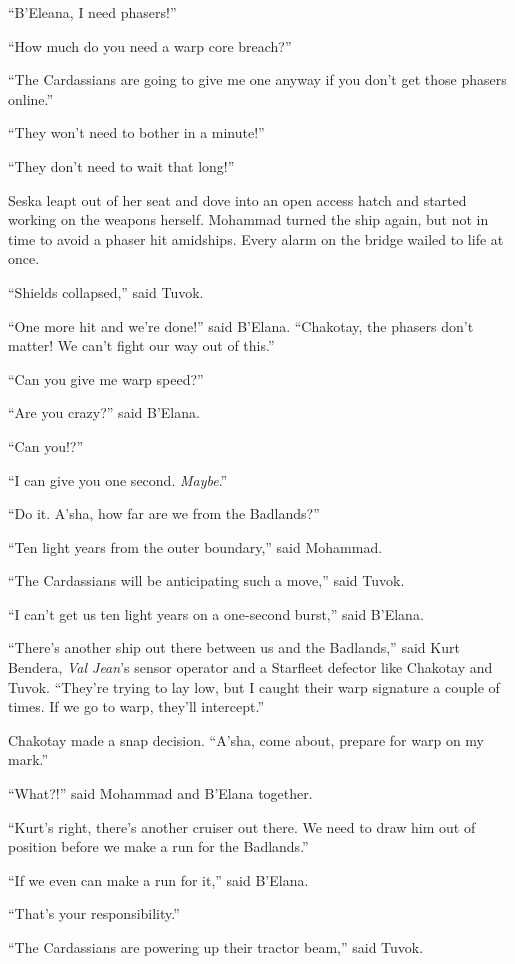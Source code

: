 \documentclass[twoside,letterpaper,12pt]{memoir}
\begin{document}
``B'Eleana, I need phasers!''

``How much do you need a warp core breach?''

``The Cardassians are going to give me one anyway if you don't get those phasers online.''

``They won't need to bother in a minute!''

``They don't need to wait that long!''

Seska leapt out of her seat and dove into an open access hatch and started working on the weapons herself. Mohammad turned the ship again, but not in time to avoid a phaser hit amidships. Every alarm on the bridge wailed to life at once.

``Shields collapsed,'' said Tuvok.

``One more hit and we're done!'' said B'Elana. ``Chakotay, the phasers don't matter! We can't fight our way out of this.''

``Can you give me warp speed?''

``Are you crazy?'' said B'Elana.

``Can you!?''

``I can give you one second. \textit{Maybe}.''

``Do it. A'sha, how far are we from the Badlands?''

``Ten light years from the outer boundary,'' said Mohammad.

``The Cardassians will be anticipating such a move,'' said Tuvok.

``I can't get us ten light years on a one-second burst,'' said B'Elana.

``There's another ship out there between us and the Badlands,'' said Kurt Bendera, \textit{Val Jean}'s sensor operator and a Starfleet defector like Chakotay and Tuvok. ``They're trying to lay low, but I caught their warp signature a couple of times. If we go to warp, they'll intercept.''

Chakotay made a snap decision. ``A'sha, come about, prepare for warp on my mark.''

``What?!'' said Mohammad and B'Elana together.

``Kurt's right, there's another cruiser out there. We need to draw him out of position before we make a run for the Badlands.''

``If we even can make a run for it,'' said B'Elana.

``That's your responsibility.''

``The Cardassians are powering up their tractor beam,'' said Tuvok.
\end{document}

